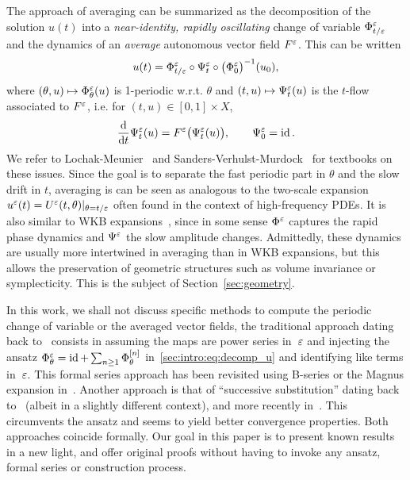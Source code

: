 %

The approach of averaging can be summarized as the decomposition of the
solution \( u(t) \) into a \textit{near-identity, rapidly oscillating}
change of variable \(\Phi^{\varepsilon}_{t/\varepsilon} \) and the dynamics of an
\textit{average} autonomous vector field \( F^{\varepsilon} \). This can be written
\begin{equation} \label{sec:intro:eq:decomp_u}
  u(t) = \Phi^{\varepsilon}_{t/\varepsilon} \circ \Psi^{\varepsilon}_t \circ 
    \big( \Phi^{\varepsilon}_0 \big)^{-1} (u_0), 
\end{equation}
where \( (\theta,u) \mapsto \Phi^{\varepsilon}_\theta(u) \) is 1-periodic w.r.t.
\( \theta \) and \( (t,u) \mapsto \Psi^{\varepsilon}_t(u) \) is the $t$-flow
associated to \( F^{\varepsilon} \), i.e. for $(t,u) \in [0,1] \times X$, 
\begin{equation}
  \frac{\mathrm{d}}{\mathrm{d} t} \Psi^{\varepsilon}_t(u) = F^{\varepsilon} \big( \Psi^{\varepsilon}_t(u) \big) ,
  \qquad \Psi^{\varepsilon}_0 = \operatorname{id} . 
\end{equation}
We refer to Lochak-Meunier~\cite{lochak.1988.multiphase} and
Sanders-Verhulst-Murdock~\cite{sanders.2007.averaging} for textbooks on
these issues. Since the goal is to separate the fast periodic part in
$\theta$ and the slow drift in $t$, averaging is can be seen as analogous
to the two-scale expansion $u^{\varepsilon}(t) = U^{\varepsilon}(t, \theta) |_{\theta =
t/\varepsilon}$ often found in the context of high-frequency PDEs. It
is also similar to WKB expansions~\cite{wentzel.1926.eine,kramers.1926.wellenmechanik,brillouin.1926.remarques}, since in some sense $\Phi^{\varepsilon}$
captures the rapid phase dynamics and $\Psi^{\varepsilon}$ the slow amplitude
changes. Admittedly, these dynamics are usually more intertwined in
averaging than in WKB expansions, but this allows the preservation of
geometric structures such as volume invariance or symplecticity. This is
the subject of Section~\ref{sec:geometry}.

In this work, we shall not discuss specific methods to compute the
periodic change of variable or the averaged vector fields, the traditional
approach dating back to~\cite{perko.1969.higher} consists in assuming the
maps are power series in~$\varepsilon$ and injecting the ansatz $\Phi^{\varepsilon}_\theta
= \operatorname{id} + \sum_{n \geq 1} \Phi^{[n]}_{\theta}$
in~\eqref{sec:intro:eq:decomp_u} and identifying like terms in~$\varepsilon$.
This formal series approach has been revisited using B-series or the
Magnus expansion in~\cite{chartier.2010.higher,
chartier.2012.formal, casas.2019.continuous}.
%
Another approach is that of ``successive substitution'' dating back
to~\cite{neishtadt.1984.separation} (albeit in a slightly different
context), and more recently in~\cite{castella.2015.stroboscopic,
chartier.2020.new}. This circumvents the ansatz and seems to yield better
convergence properties. Both approaches coincide formally. 
%
Our goal in this paper is to present known results in a new light, and
offer original proofs without having to invoke any ansatz, formal series
or construction process. 

